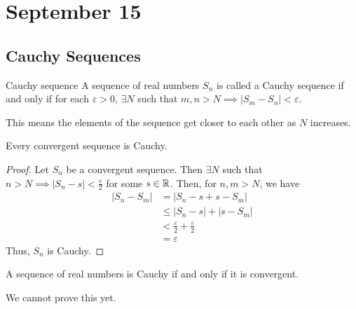 \chapter{September 15}

\section{Cauchy Sequences}
\begin{definition}{Cauchy sequence}{}
    A sequence of real numbers $S_n$ is called a Cauchy sequence if and only if for each $\varepsilon > 0$, $\exists N$ such that $m, n > N \implies |S_m - S_n| < \varepsilon$.
\end{definition}
\begin{note}
    This means the elements of the sequence get closer to each other as $N$ increases.
\end{note}

\begin{theorem}{}{}
    Every convergent sequence is Cauchy.
\end{theorem}
\begin{proof}
    Let $S_n$ be a convergent sequence. Then $\exists N$ such that $n > N \implies |S_n - s| < \frac{\varepsilon}{2}$ for some $s \in \mathbb{R}$. Then, for $n, m > N$, we have
    \begin{align*}
        |S_n - S_m| &= |S_n - s + s - S_m| \\
        &\leq |S_n - s| + |s - S_m| \\
        &< \frac{\varepsilon}{2} + \frac{\varepsilon}{2} \\
        &= \varepsilon
    \end{align*}
    Thus, $S_n$ is Cauchy.
\end{proof}

\begin{theorem}{}{}
    A sequence of real numbers is Cauchy if and only if it is convergent.
\end{theorem}
\begin{note}
    We cannot prove this yet.
\end{note}